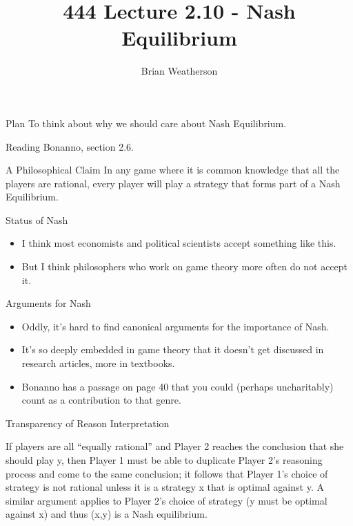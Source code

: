 \documentclass[
  ignorenonframetext,
]{beamer}
\title{444 Lecture 2.10 - Nash Equilibrium}
\author{Brian Weatherson}
\date{}
\providecommand{\tightlist}{%
  \setlength{\itemsep}{0pt}\setlength{\parskip}{0pt}}
\renewenvironment*{quote}	
	{\list{}{\rightmargin   \leftmargin} \item } 	
	{\endlist }
\begin{document}
\frame{\titlepage}

\begin{frame}{Plan}
\protect\hypertarget{plan}{}
To think about why we should care about Nash Equilibrium.
\end{frame}

\begin{frame}{Reading}
\protect\hypertarget{reading}{}
Bonanno, section 2.6.
\end{frame}

\begin{frame}{A Philosophical Claim}
\protect\hypertarget{a-philosophical-claim}{}
In any game where it is common knowledge that all the players are
rational, every player will play a strategy that forms part of a Nash
Equilibrium.
\end{frame}

\begin{frame}{Status of Nash}
\protect\hypertarget{status-of-nash}{}
\begin{itemize}
\tightlist
\item
  I think most economists and political scientists accept something like
  this.
\item
  But I think philosophers who work on game theory more often do not
  accept it.
\end{itemize}
\end{frame}

\begin{frame}{Arguments for Nash}
\protect\hypertarget{arguments-for-nash}{}
\begin{itemize}
\tightlist
\item
  Oddly, it's hard to find canonical arguments for the importance of
  Nash.
\item
  It's so deeply embedded in game theory that it doesn't get discussed
  in research articles, more in textbooks.
\item
  Bonanno has a passage on page 40 that you could (perhaps uncharitably)
  count as a contribution to that genre.
\end{itemize}
\end{frame}

\begin{frame}{Transparency of Reason Interpretation}
\protect\hypertarget{transparency-of-reason-interpretation}{}
\begin{quote}
If players are all ``equally rational'' and Player 2 reaches the
conclusion that she should play y, then Player 1 must be able to
duplicate Player 2's reasoning process and come to the same conclusion;
it follows that Player 1's choice of strategy is not rational unless it
is a strategy x that is optimal against y. A similar argument applies to
Player 2's choice of strategy (y must be optimal against x) and thus
(x,y) is a Nash equilibrium.
\end{quote}
\end{frame}
\end{document}
